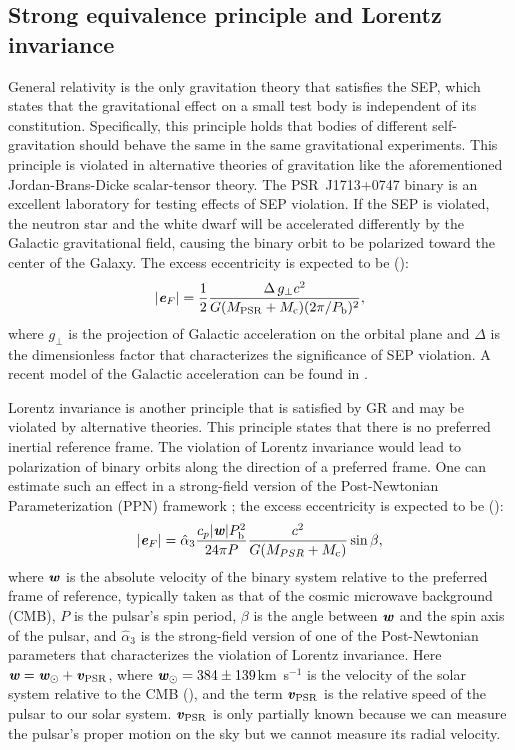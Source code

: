 \subsection{Strong equivalence principle and Lorentz invariance}
\label{sec:sep}
General relativity is the only gravitation theory that satisfies
the SEP, which states that the gravitational
effect on a small test body is independent of its constitution. Specifically,
this principle holds that bodies of different self-gravitation should behave the same in
the same gravitational experiments. This principle is violated in alternative
theories of gravitation like the aforementioned Jordan-Brans-Dicke
scalar-tensor theory. The PSR~J1713+0747 binary is an excellent laboratory for testing 
effects of SEP violation. If the SEP is violated, the neutron star and the white
dwarf will be accelerated differently by the Galactic gravitational field, causing
the binary orbit to be polarized toward the center of the Galaxy. The excess 
eccentricity is expected to be (\citealt{ds91}):
\begin{equation}
|\textbf{\textit{e}}_F| = \frac{1}{2}\frac{\Delta\, g_{\bot}
  c^2}{G(M_{\rm PSR}+M_{\rm
c})(2\pi/P_{\rm b})^2},
\end{equation}
where $g_{\bot}$ is the projection of Galactic acceleration on the orbital plane 
and $\Delta$ is the dimensionless factor that characterizes the significance 
of SEP violation. A recent model of the Galactic acceleration can be found in
\citet{hf04a}.

Lorentz invariance is another principle that is satisfied by GR and may
be violated by alternative theories. This principle
states that there is no preferred inertial reference frame. The violation of
Lorentz invariance would lead to polarization of binary orbits along the
direction of a preferred frame.
One can estimate such an effect in a strong-field version of the Post-Newtonian Parameterization
(PPN) framework \cite{de92}; the excess eccentricity is expected to be (\citealt{bd96}):
\begin{equation}
|\textbf{\textit{e}}_F| = \hat{\alpha}_3 \frac{c_p|\textbf{\textit{w}}|P_{\rm b}^2}{24\pi P}
\frac{c^2}{G (M_{PSR}+M_{\rm c})}\sin \beta,
\end{equation}
where $\textbf{\textit{w}}$ is the absolute velocity of the binary system
relative to the preferred frame of reference, typically taken as that of the cosmic microwave background (CMB), $P$ is the pulsar's spin period, $\beta$ is the
angle between $\textbf{\textit{w}}$ and the spin axis of the pulsar, and
$\hat{\alpha}_3$ is the strong-field version of one of the Post-Newtonian
parameters that characterizes the violation of Lorentz invariance. 
Here $\textbf{\textit{w}} = \textbf{\textit{w}}_{\odot} + \textbf{\textit{v}}_{\rm PSR}$, where
$\textbf{\textit{w}}_{\odot}=384\pm139$km~s$^{-1}$ is the velocity of
the solar system relative to the CMB (\citealt{aaa+13}),
and the term $\textbf{\textit{v}}_{\rm PSR}$ is the relative speed of the pulsar to our solar system. $\textbf{\textit{v}}_{\rm PSR}$ is only partially known because we can measure the pulsar's
proper motion on the sky but we cannot measure its radial velocity.

